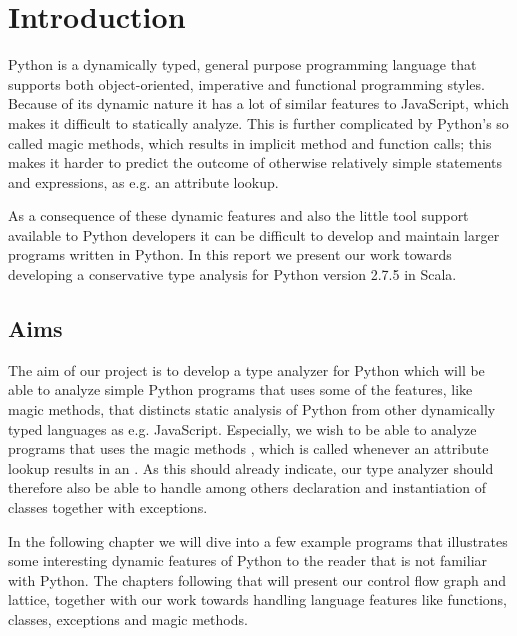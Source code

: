 \chapter{Introduction}
Python is a dynamically typed, general purpose programming language that supports both object-oriented, imperative and functional programming styles. Because of its dynamic nature it has a lot of similar features to JavaScript, which makes it difficult to statically analyze. This is further complicated by Python's so called magic methods, which results in implicit method and function calls; this makes it harder to predict the outcome of otherwise relatively simple statements and expressions, as e.g. an attribute lookup.

As a consequence of these dynamic features and also the little tool support available to Python developers it can be difficult to develop and maintain larger programs written in Python. In this report we present our work towards developing a conservative type analysis for Python version 2.7.5 in Scala.

\section{Aims}
The aim of our project is to develop a type analyzer for Python which will be able to analyze simple Python programs that uses some of the features, like magic methods, that distincts static analysis of Python from other dynamically typed languages as e.g. JavaScript. Especially, we wish to be able to analyze programs that uses the magic methods , which is called whenever an attribute lookup results in an . As this should already indicate, our type analyzer should therefore also be able to handle among others declaration and instantiation of classes together with exceptions.

In the following chapter we will dive into a few example programs that illustrates some interesting dynamic features of Python to the reader that is not familiar with Python. The chapters following that will present our control flow graph and lattice, together with our work towards handling language features like functions, classes, exceptions and magic methods.